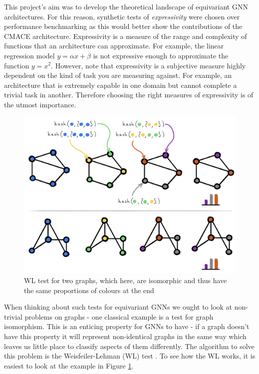 This project's aim was to develop the theoretical landscape of equivariant GNN architectures. For this reason, synthetic tests of \textit{expressivity} were chosen over performance benchmarking as this would better show the contributions of the CMACE architecture. Expressivity is a measure of the range and complexity of functions that an architecture can approximate. For example, the linear regression model $y = \alpha x + \beta$ is not expressive enough to approximate the function $y = x^2$. However, note that expressivity is a subjective measure highly dependent on the kind of task you are measuring against. For example, an architecture that is extremely capable in one domain but cannot complete a trivial task in another. Therefore choosing the right measures of expressivity is of the utmost importance. 

\begin{figure}[H]
    \centering
    \includegraphics[scale=0.2]{figures/wl-test.png}
    \caption{WL test for two graphs, which here, are isomorphic and thus have the same proportions of colours at the end  \cite{Bronstein2020}}
    \label{fig:wl-test}
\end{figure}

When thinking about such tests for equivariant GNNs we ought to look at non-trivial problems on graphs - one classical example is a test for graph isomorphism. This is an enticing property for GNNs to have - if a graph doesn't have this property it will represent non-identical graphs in the same way which leaves us little place to classify aspects of them differently. The algorithm to solve this problem \cite{read1977graph} is the Weisfeiler-Lehman (WL) test \cite{weisfeiler1968reduction}. To see how the WL works, it is easiest to look at the example in Figure \ref{fig:wl-test}. 

